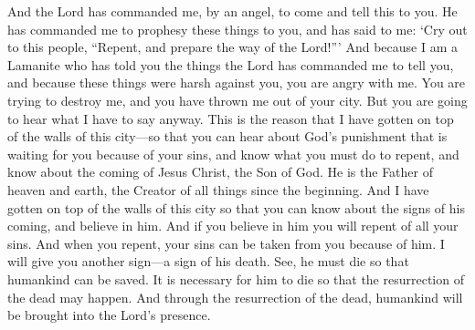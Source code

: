 And the Lord has commanded me, by an angel, to come and tell this to you. He has commanded me to prophesy these things to you, and has said to me: \lq Cry out to this people, ``Repent, and prepare the way of the Lord!''\rq 
\bverse \iffalse And now, because I am a Lamanite, and have spoken unto you the words which the Lord hath commanded me, and because it was hard against you, ye are angry with me and do seek to destroy me, and have cast me out from among you. \fi
And because I am a Lamanite who has told you the things the Lord has commanded me to tell you, and because these things were harsh against you, you are angry with me. You are trying to destroy me, and you have thrown me out of your city.
\bverse \iffalse And ye shall hear my words, for, for this intent have I come up upon the walls of this city, that ye might hear and know of the judgments of God which do await you because of your iniquities, and also that ye might know the conditions of repentance; \fi
But you are going to hear what I have to say anyway. This is the reason that I have gotten on top of the walls of this city---so that you can hear about God's punishment that is waiting for you because of your sins, and know what you must do to repent,
\bverse \iffalse And also that ye might know of the coming of Jesus Christ, the Son of God, the Father of heaven and of earth, the Creator of all things from the beginning; and that ye might know of the signs of his coming, to the intent that ye might believe on his name. \fi
and know about the coming of Jesus Christ, the Son of God. He is the Father of heaven and earth, the Creator of all things since the beginning. And I have gotten on top of the walls of this city so that you can know about the signs of his coming, and believe in him.
\bverse \iffalse And if ye believe on his name ye will repent of all your sins, that thereby ye may have a remission of them through his merits. \fi
And if you believe in him you will repent of all your sins. And when you repent, your sins can be taken from you because of him.
\bverse \iffalse And behold, again, another sign I give unto you, yea, a sign of his death. \fi
I will give you another sign---a sign of his death.
\bverse \iffalse For behold, he surely must die that salvation may come; yea, it behooveth him and becometh expedient that he dieth, to bring to pass the resurrection of the dead, that thereby men may be brought into the presence of the Lord. \fi
See, he must die so that humankind can be saved. It is necessary for him to die so that the resurrection of the dead may happen. And through the resurrection of the dead, humankind will be brought into the Lord's presence.
